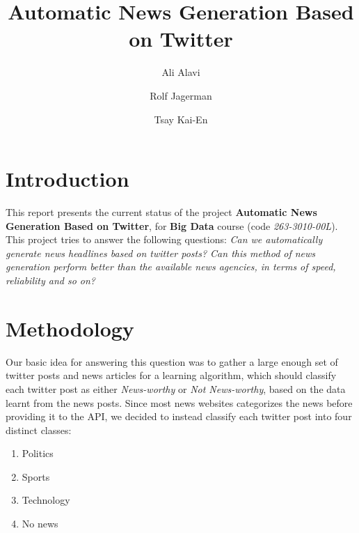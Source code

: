 \documentclass{llncs}
\begin{document}
%
%

%


%
\mainmatter              %
%
\title{Automatic News Generation Based on Twitter}
%
%
\author{Ali Alavi \and Rolf Jagerman \and
Tsay Kai-En}
%
%
%

\maketitle              %
%
\section{Introduction}
%
This report presents the current status of the project \textbf{Automatic News Generation Based on Twitter}, 
for \textbf{Big Data} course (code \textit{263-3010-00L}). This project tries to answer the following questions: 
\textit{Can we automatically generate news headlines based on twitter posts? Can this method of news generation 
perform better than the available news agencies, in terms of speed, reliability and so on?}

\section{Methodology}
Our basic idea for answering this question was to gather a large enough set of twitter posts and news articles for a learning algorithm, which should classify each twitter post as either \textit{News-worthy} or \textit{Not News-worthy}, based on the data learnt from the news posts. Since most news websites categorizes the news before providing it to the API, we decided to instead classify each twitter post into four distinct classes: 
\begin{enumerate}
\item Politics
\item Sports
\item Technology
\item No news
\end{enumerate}
\end{document}
